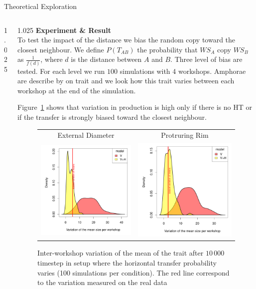\documentclass[final]{beamer}
\newlength{\onecolwid}
\newlength{\twocolwid}
\begin{document}
\begin{frame}[t]
\begin{columns}[t]
\begin{column}{\twocolwid}
\begin{block}{Theoretical Exploration}
\begin{columns}[t,totalwidth=\twocolwid]
\begin{column}{1.025\onecolwid}
\begin{center}
{    }
\end{center}
\end{column}

\begin{column}{1.025\onecolwid} %
{\textbf{Experiment \& Result}}\\
\justify
To test the impact of the distance we bias the random copy toward the closest neighbour. We define $P(T_{AB})$ the probability that $WS_A$ copy $WS_B$ as $\frac{1}{f(d)}$, where $d$ is the distance between $A$ and $B$. Three level of bias are tested. For each level we run $100$ simulations with 4 workshops. Amphorae are describe by on trait and we look how this trait varies between each workshop at the end of the simulation.

Figure~\ref{fig:resmod} shows that variation in production is high only if there is no HT or if the transfer is strongly biased toward the closest neighbour.
    \begin{figure}[h!]
	\begin{tabular}{cc}
	    \centering
	    External Diameter & Protruring Rim\\
	    \includegraphics[width=0.4\linewidth]{images/ED_densities.pdf}&
	    \includegraphics[width=0.4\linewidth]{images/PR_densities.pdf}\\
	\end{tabular}
\singlespace
\vspace{-.8cm}
\caption{Inter-workshop variation of the mean of the trait after $10\,000$ timestep in setup where the horizontal transfer probability varies (100 simulations per condition). The red line correspond to the variation measured on the real data}
	\label{fig:resmod}
    \end{figure}
\vspace{-1cm}
\end{column}
\end{columns}


\end{block}
\end{column}
\end{columns}
\end{frame}
\end{document}
